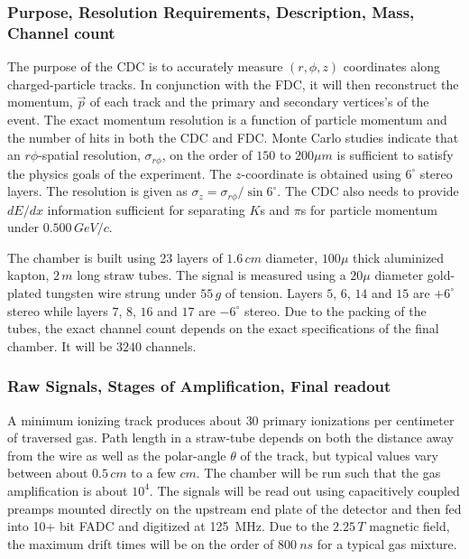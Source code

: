 \subsubsection*{Purpose, Resolution Requirements, Description, Mass, Channel count}

The purpose of the CDC is to accurately measure $(r,\phi,z)$
coordinates along charged-particle tracks. In conjunction with the FDC, it
will then  reconstruct the momentum, $\vec{p}$ of each track and the primary and
secondary vertices's of the event. The exact momentum resolution is a function 
of particle momentum and the number of hits in both the CDC and FDC. Monte Carlo
studies indicate that an $r\phi$-spatial resolution, $\sigma_{r\phi}$, on the 
order of $150$ to $200\mu m$ is sufficient to satisfy the physics goals of the 
experiment. The $z$-coordinate is obtained using $6^{\circ}$ stereo layers. 
The resolution is given as $\sigma_{z}=\sigma_{r\phi}/\sin 6^{\circ}$.  
The CDC also needs to provide $dE/dx$ information sufficient for separating 
$K$s and $\pi$s for particle momentum under $0.500\,GeV/c$.

The chamber is built using 23 layers of $1.6\,cm$ diameter, $100\mu$ thick
aluminized kapton, $2\,m$ long straw tubes. The signal is measured using a
$20\mu$ diameter gold-plated tungsten wire strung under $55\, g$ of tension.
Layers $5$, $6$, $14$ and $15$ are $+6^{\circ}$ stereo while layers
$7$, $8$, $16$ and $17$ are $-6^{\circ}$ stereo. Due to the packing of the
tubes, the exact channel count depends on the exact specifications of the
final chamber. It will be $3240$ channels.

\subsubsection*{Raw Signals, Stages of Amplification, Final readout}

A minimum ionizing track produces about $30$ primary ionizations per 
centimeter of traversed gas. Path length in a straw-tube depends on
both the distance away from the wire as well as the polar-angle $\theta$
of the track, but typical values vary between about $0.5\, cm$ to a few $cm$.
The chamber will be run such that the gas amplification is about $10^{4}$.
The signals will be read out using capacitively coupled preamps mounted
directly on the upstream end plate of the detector and then fed into 10+ bit
FADC and digitized at 125~MHz. Due to the $2.25\, T$ magnetic field, the maximum
drift times will be on the order of $800~ns$ for a typical gas mixture. 


